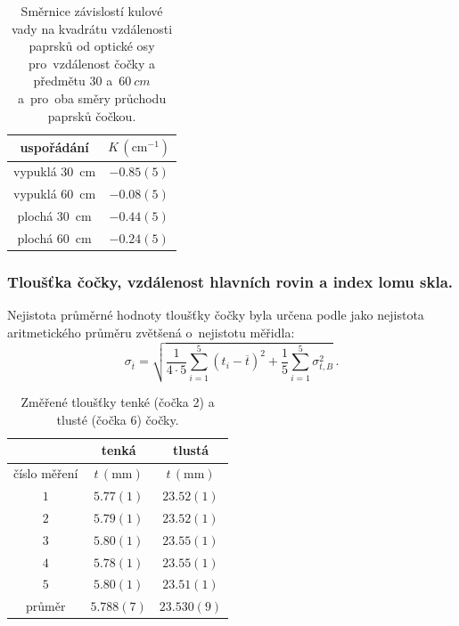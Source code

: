 \documentclass{../concepts/titul_zprava_p/prepareprotokolZprava} %
\begin{document}
\begin{table}[!htbp]
\centering
\caption{Směrnice závislostí kulové vady na kvadrátu vzdálenosti paprsků od optické osy pro~vzdálenost čočky a předmětu $30$ 
a~$\qty{60}{cm}$ a~pro~oba směry průchodu paprsků čočkou.}
\begin{tabular}{c|c}
 \toprule
 uspořádání & $K\, (\mathrm{cm^{-1}})$ \\
 \midrule
 vypuklá \qty{30}{cm}& $-0.85(5)$ \\
 vypuklá \qty{60}{cm}& $-0.08(5)$ \\
 plochá \qty{30}{cm}& $-0.44(5)$ \\
 plochá \qty{60}{cm}& $-0.24(5)$ \\
 \bottomrule
\end{tabular}
\label{tab:smernice}
\end{table}


\subsubsection{Tloušťka čočky, vzdálenost hlavních rovin a index lomu skla.}

Nejistota průměrné hodnoty tloušťky čočky byla určena podle \cite{englich} jako nejistota aritmetického průměru zvětšená
o~nejistotu měřidla:
\begin{equation}
    \label{eq:sigma_mean_t}
    \sigma_{\overline{t}} = \sqrt{ \frac{1}{4 \cdot 5} \sum_{i=1}^{5} \left( t_i - \overline{t} \right)^2
    + \frac{1}{5} \sum_{i=1}^{5} \sigma_{t,B}^2 } \,.
\end{equation}

\begin{table}[!htbp]
\centering
\caption{Změřené tloušťky tenké (čočka 2) a tlusté (čočka 6) čočky.}
\begin{tabular}{c|c|c}
 \toprule
  & tenká & tlustá \\
 \midrule
 číslo měření & $t\, (\mathrm{mm})$ & $t\, (\mathrm{mm})$ \\
 \midrule
 $1$ & $5.77(1)$ & $23.52(1)$ \\
 $2$ & $5.79(1)$ & $23.52(1)$ \\
 $3$ & $5.80(1)$ & $23.55(1)$ \\
 $4$ & $5.78(1)$ & $23.55(1)$ \\
 $5$ & $5.80(1)$ & $23.51(1)$ \\
 \midrule
 průměr & $5.788(7)$ & $23.530(9)$ \\
 \bottomrule
\end{tabular}
\label{tab:tloustky}
\end{table}
\end{document}
